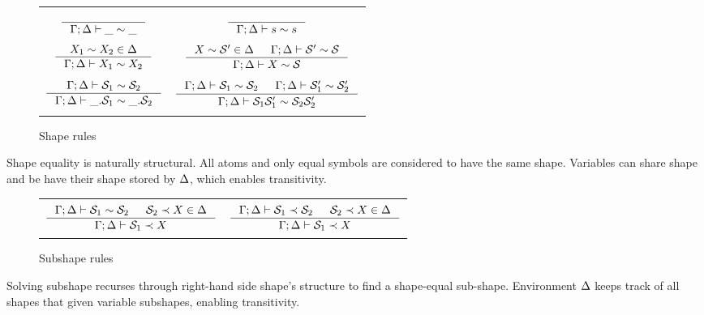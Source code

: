\documentclass[english, mgr]{iithesis}
\newcommand{\solverRule}{\vdash}
\begin{document}
\begin{figure}[htbp]
    \centering
    \begin{tabularx}{\textwidth}{|CC|}
      \hline & \\ $
      \inference{
      }{
        \cEnv ; \icEnv \solverRule \shatom \csheq \shatom
      }
      $ & $
      \inference{
      }{
        \cEnv ; \icEnv \solverRule \symb \csheq \symb
      }
      $ \\ & \\
      $
      \inference{
        \termv_1 \csheq \termv_2 \in \icEnv
      }{
        \cEnv ; \icEnv \solverRule \termv_1 \csheq \termv_2
      }
      $ & $
      \inference{
        \termv  \csheq \shape' \in \icEnv
        &
        \cEnv ; \icEnv \solverRule \shape'  \csheq \shape
      }{
        \cEnv ; \icEnv \solverRule \termv  \csheq \shape
      }
      $ \\ & \\
      $\inference{
        \cEnv ; \icEnv \solverRule \shape_1 \csheq \shape_2
      }{
        \cEnv ; \icEnv \solverRule \shbind \shape_1 \csheq \shbind \shape_2
      }
      $ & $
      \inference{
        \cEnv ; \icEnv \solverRule \shape_1 \csheq \shape_2
        &
        \cEnv ; \icEnv \solverRule \shape_1' \csheq \shape_2'
      }{
        \cEnv ; \icEnv \solverRule \shape_1 \shape_1' \csheq \shape_2 \shape_2'
      }
      $ \\ & \\ \hline
      \end{tabularx}
  \caption{Shape rules}
  \label{fig:shape-rules}
\end{figure}
Shape equality is naturally structural.
All atoms and only equal symbols are considered to have the same shape.
Variables can share shape and be have their shape stored by $\Delta$,
which enables transitivity.

\begin{figure}[htbp]
    \centering
    \begin{tabularx}{\textwidth}{|CC|}
      \hline & \\ $
      \inference{
        \cEnv ; \icEnv \solverRule \shape_1 \csheq \shape_2
        &
        \shape_2 \cshlt \termv \in \icEnv
      }{
        \cEnv ; \icEnv \solverRule \shape_1 \cshlt \termv
      }
      $ & $
      \inference{
        \cEnv ; \icEnv \solverRule \shape_1 \cshlt \shape_2
        &
        \shape_2 \cshlt \termv \in \icEnv
      }{
        \cEnv ; \icEnv \solverRule \shape_1 \cshlt \termv
      }
      $ \\ & \\ \hline
      \end{tabularx}
  \caption{Subshape rules}
  \label{fig:subshape-rules}
\end{figure}
Solving subshape recurses through right-hand side shape's structure to find a shape-equal sub-shape.
Environment $\Delta$ keeps track of all shapes that given variable subshapes,
enabling transitivity.
\end{document}
